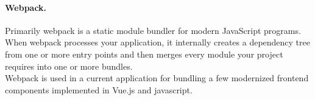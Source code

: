 \paragraph*{Webpack.} Primarily webpack is a static module bundler for modern JavaScript programs. When webpack processes your application, it internally creates a dependency tree from one or more entry points and then merges every module your project requires into one or more bundles.\cite{webpack-doc}\\
Webpack is used in a current application for bundling a few modernized frontend components implemented in Vue.js and javascript.

